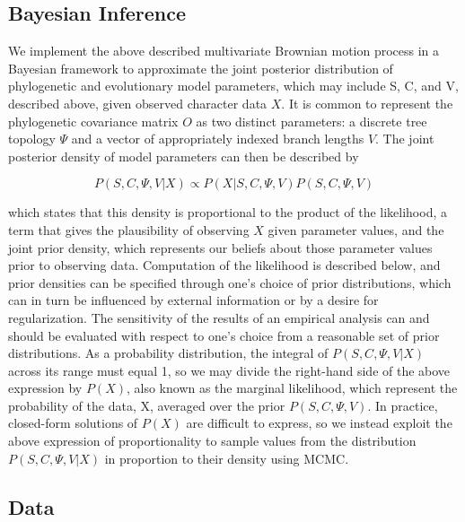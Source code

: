\subsection{Bayesian Inference}

We implement the above described multivariate Brownian motion process in a Bayesian framework to approximate the joint posterior distribution of phylogenetic and evolutionary model parameters, which may include S, C, and V, described above, given observed character data $X$. It is common to represent the phylogenetic covariance matrix $O$ as two distinct parameters: a discrete tree topology $\Psi$ and a vector of appropriately indexed branch lengths $V$. The joint posterior density of model parameters can then be described by 

{\[P(S, C, \Psi, V | X) \propto P(X | S, C, \Psi, V) P(S, C, \Psi, V)\]}

which states that this density is proportional to the product of the likelihood, a term that gives the plausibility of observing $X$ given parameter values, and the joint prior density, which represents our beliefs about those parameter values prior to observing data. Computation of the likelihood is described below, and prior densities can be specified through one's choice of prior distributions, which can in turn be influenced by external information or by a desire for regularization. The sensitivity of the results of an empirical analysis can and should be evaluated with respect to one's choice from a reasonable set of prior distributions. As a probability distribution, the integral of $P(S, C, \Psi, V | X)$ across its range must equal 1, so we may divide the right-hand side of the above expression by $P(X)$, also known as the marginal likelihood, which represent the probability of the data, X, averaged over the prior $P(S, C, \Psi, V)$. In practice, closed-form solutions of $P(X)$ are difficult to express, so we instead exploit the above expression of proportionality to sample values from the distribution $P(S, C, \Psi, V | X)$ in proportion to their density using MCMC.

\subsection{Data}

